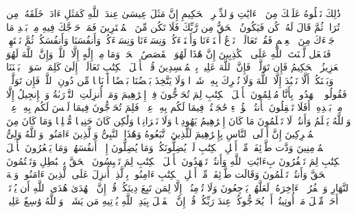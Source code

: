 \startbuffer[\q:3:58]
ذَٰلِكَ نَتۡلُوهُ عَلَیۡكَ مِنَ ٱلۡءَایَٰتِ وَٱلذِّكۡرِ ٱلۡحَكِیمِ%
\stopbuffer
\startbuffer[\q:3:59]
إِنَّ مَثَلَ عِیسَىٰ عِندَ ٱللَّهِ كَمَثَلِ ءَادَمَۖ خَلَقَهُۥ مِن تُرَابࣲ ثُمَّ قَالَ لَهُۥ كُن فَیَكُونُ%
\stopbuffer
\startbuffer[\q:3:60]
ٱلۡحَقُّ مِن رَّبِّكَ فَلَا تَكُن مِّنَ ٱلۡمُمۡتَرِینَ%
\stopbuffer
\startbuffer[\q:3:61]
فَمَنۡ حَاۤجَّكَ فِیهِ مِنۢ بَعۡدِ مَا جَاۤءَكَ مِنَ ٱلۡعِلۡمِ فَقُلۡ تَعَالَوۡا۟ نَدۡعُ أَبۡنَاۤءَنَا وَأَبۡنَاۤءَكُمۡ وَنِسَاۤءَنَا وَنِسَاۤءَكُمۡ وَأَنفُسَنَا وَأَنفُسَكُمۡ ثُمَّ نَبۡتَهِلۡ فَنَجۡعَل لَّعۡنَتَ ٱللَّهِ عَلَى ٱلۡكَٰذِبِینَ%
\stopbuffer
\startbuffer[\q:3:62]
إِنَّ هَٰذَا لَهُوَ ٱلۡقَصَصُ ٱلۡحَقُّۚ وَمَا مِنۡ إِلَٰهٍ إِلَّا ٱللَّهُۚ وَإِنَّ ٱللَّهَ لَهُوَ ٱلۡعَزِیزُ ٱلۡحَكِیمُ%
\stopbuffer
\startbuffer[\q:3:63]
فَإِن تَوَلَّوۡا۟ فَإِنَّ ٱللَّهَ عَلِیمُۢ بِٱلۡمُفۡسِدِینَ%
\stopbuffer
\startbuffer[\q:3:64]
قُلۡ یَٰۤأَهۡلَ ٱلۡكِتَٰبِ تَعَالَوۡا۟ إِلَىٰ كَلِمَةࣲ سَوَاۤءِۭ بَیۡنَنَا وَبَیۡنَكُمۡ أَلَّا نَعۡبُدَ إِلَّا ٱللَّهَ وَلَا نُشۡرِكَ بِهِۦ شَیۡءࣰا وَلَا یَتَّخِذَ بَعۡضُنَا بَعۡضًا أَرۡبَابࣰا مِّن دُونِ ٱللَّهِۚ فَإِن تَوَلَّوۡا۟ فَقُولُوا۟ ٱشۡهَدُوا۟ بِأَنَّا مُسۡلِمُونَ%
\stopbuffer
\startbuffer[\q:3:65]
یَٰۤأَهۡلَ ٱلۡكِتَٰبِ لِمَ تُحَاۤجُّونَ فِیۤ إِبۡرَٰهِیمَ وَمَاۤ أُنزِلَتِ ٱلتَّوۡرَىٰةُ وَٱلۡإِنجِیلُ إِلَّا مِنۢ بَعۡدِهِۦۤۚ أَفَلَا تَعۡقِلُونَ%
\stopbuffer
\startbuffer[\q:3:66]
هَٰۤأَنتُمۡ هَٰۤؤُلَاۤءِ حَٰجَجۡتُمۡ فِیمَا لَكُم بِهِۦ عِلۡمࣱ فَلِمَ تُحَاۤجُّونَ فِیمَا لَیۡسَ لَكُم بِهِۦ عِلۡمࣱۚ وَٱللَّهُ یَعۡلَمُ وَأَنتُمۡ لَا تَعۡلَمُونَ%
\stopbuffer
\startbuffer[\q:3:67]
مَا كَانَ إِبۡرَٰهِیمُ یَهُودِیࣰّا وَلَا نَصۡرَانِیࣰّا وَلَٰكِن كَانَ حَنِیفࣰا مُّسۡلِمࣰا وَمَا كَانَ مِنَ ٱلۡمُشۡرِكِینَ%
\stopbuffer
\startbuffer[\q:3:68]
إِنَّ أَوۡلَى ٱلنَّاسِ بِإِبۡرَٰهِیمَ لَلَّذِینَ ٱتَّبَعُوهُ وَهَٰذَا ٱلنَّبِیُّ وَٱلَّذِینَ ءَامَنُوا۟ۗ وَٱللَّهُ وَلِیُّ ٱلۡمُؤۡمِنِینَ%
\stopbuffer
\startbuffer[\q:3:69]
وَدَّت طَّاۤئِفَةࣱ مِّنۡ أَهۡلِ ٱلۡكِتَٰبِ لَوۡ یُضِلُّونَكُمۡ وَمَا یُضِلُّونَ إِلَّاۤ أَنفُسَهُمۡ وَمَا یَشۡعُرُونَ%
\stopbuffer
\startbuffer[\q:3:70]
یَٰۤأَهۡلَ ٱلۡكِتَٰبِ لِمَ تَكۡفُرُونَ بِءَایَٰتِ ٱللَّهِ وَأَنتُمۡ تَشۡهَدُونَ%
\stopbuffer
\startbuffer[\q:3:71]
یَٰۤأَهۡلَ ٱلۡكِتَٰبِ لِمَ تَلۡبِسُونَ ٱلۡحَقَّ بِٱلۡبَٰطِلِ وَتَكۡتُمُونَ ٱلۡحَقَّ وَأَنتُمۡ تَعۡلَمُونَ%
\stopbuffer
\startbuffer[\q:3:72]
وَقَالَت طَّاۤئِفَةࣱ مِّنۡ أَهۡلِ ٱلۡكِتَٰبِ ءَامِنُوا۟ بِٱلَّذِیۤ أُنزِلَ عَلَى ٱلَّذِینَ ءَامَنُوا۟ وَجۡهَ ٱلنَّهَارِ وَٱكۡفُرُوۤا۟ ءَاخِرَهُۥ لَعَلَّهُمۡ یَرۡجِعُونَ%
\stopbuffer
\startbuffer[\q:3:73]
وَلَا تُؤۡمِنُوۤا۟ إِلَّا لِمَن تَبِعَ دِینَكُمۡ قُلۡ إِنَّ ٱلۡهُدَىٰ هُدَى ٱللَّهِ أَن یُؤۡتَىٰۤ أَحَدࣱ مِّثۡلَ مَاۤ أُوتِیتُمۡ أَوۡ یُحَاۤجُّوكُمۡ عِندَ رَبِّكُمۡۗ قُلۡ إِنَّ ٱلۡفَضۡلَ بِیَدِ ٱللَّهِ یُؤۡتِیهِ مَن یَشَاۤءُۗ وَٱللَّهُ وَٰسِعٌ عَلِیمࣱ%
